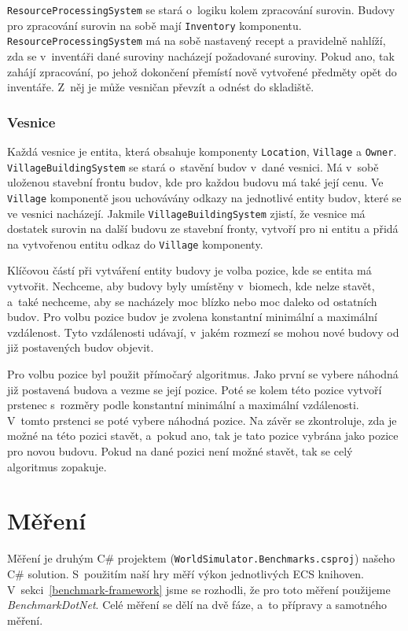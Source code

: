 \texttt{ResourceProcessingSystem} se stará o~logiku kolem zpracování surovin. Budovy pro zpracování surovin na sobě mají \texttt{Inventory} komponentu. \texttt{ResourceProcessingSystem} má na sobě nastavený recept a pravidelně nahlíží, zda se v~inventáři dané suroviny nacházejí požadované suroviny. Pokud ano, tak zahájí zpracování, po jehož dokončení přemístí nově vytvořené předměty opět do inventáře. Z~něj je může vesničan převzít a odnést do skladiště.

\subsubsection{Vesnice}
Každá vesnice je entita, která obsahuje komponenty \texttt{Location}, \texttt{Village} a \texttt{Owner}. \texttt{VillageBuildingSystem} se stará o~stavění budov v~dané vesnici. Má v~sobě uloženou stavební frontu budov, kde pro každou budovu má také její cenu. Ve \texttt{Village} komponentě jsou uchovávány odkazy na jednotlivé entity budov, které se ve vesnici nacházejí. Jakmile \texttt{VillageBuildingSystem} zjistí, že vesnice má dostatek surovin na další budovu ze stavební fronty, vytvoří pro ni entitu a přidá na vytvořenou entitu odkaz do \texttt{Village} komponenty.

Klíčovou částí při vytváření entity budovy je volba pozice, kde se entita má vytvořit. Nechceme, aby budovy byly umístěny v~biomech, kde nelze stavět, a~také nechceme, aby se nacházely moc blízko nebo moc daleko od ostatních budov. Pro volbu pozice budov je zvolena konstantní minimální a maximální vzdálenost. Tyto vzdálenosti udávají, v~jakém rozmezí se mohou nové budovy od již postavených budov objevit.

Pro volbu pozice byl použit přímočarý algoritmus. Jako první se vybere náhodná již postavená budova a vezme se její pozice. Poté se kolem této pozice vytvoří prstenec s~rozměry podle konstantní minimální a maximální vzdálenosti. V~tomto prstenci se poté vybere náhodná pozice. Na závěr se zkontroluje, zda je možné na této pozici stavět, a~pokud ano, tak je tato pozice vybrána jako pozice pro novou budovu. Pokud na dané pozici není možné stavět, tak se celý algoritmus zopakuje.

\section{Měření}
\label{benchmark-implementation}
Měření je druhým C\# projektem (\texttt{WorldSimulator.Benchmarks.csproj}) našeho C\# solution. S~použitím naší hry měří výkon jednotlivých ECS knihoven. V~sekci~\ref{benchmark-framework} jsme se rozhodli, že pro toto měření použijeme \textit{BenchmarkDotNet}. Celé měření se dělí na dvě fáze, a~to přípravy a samotného měření.

